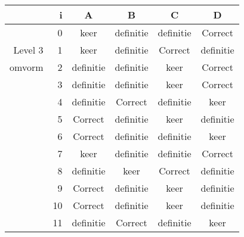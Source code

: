 \begin{tabular}{ rr| c|c|c|c}\hline\hline
     & i & \textbf{A} & \textbf{B} & \textbf{C} & \textbf{D}\\\hline

&0&keer&definitie&definitie&Correct\cellcolor[gray]{0.6}\\
Level 3 & 1&keer&definitie&Correct\cellcolor[gray]{0.6}&definitie\\
omvorm &2&definitie&definitie&keer&Correct\cellcolor[gray]{0.6}\\
&3&definitie&definitie&keer&Correct\cellcolor[gray]{0.6}\\
&4&definitie&Correct\cellcolor[gray]{0.6}&definitie&keer\\
&5&Correct\cellcolor[gray]{0.6}&definitie&keer&definitie\\
&6&Correct\cellcolor[gray]{0.6}&definitie&definitie&keer\\
&7&keer&definitie&definitie&Correct\cellcolor[gray]{0.6}\\
&8&definitie&keer&Correct\cellcolor[gray]{0.6}&definitie\\
&9&Correct\cellcolor[gray]{0.6}&definitie&keer&definitie\\
&10&Correct\cellcolor[gray]{0.6}&definitie&keer&definitie\\
&11&definitie&Correct\cellcolor[gray]{0.6}&definitie&keer\\
\hline\end{tabular}\par\ \newline

